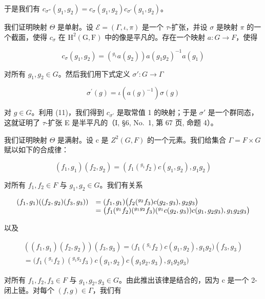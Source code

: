 于是我们有 \(c_{\sigma''}(g_1, g_2) = c_\sigma(g_1, g_2)c_{\sigma'}(g_1, g_2)\)。

我们证明映射 \(\Theta\) 是单射。设 \(\mathcal{E} = (\Gamma, \iota, \pi)\) 是一个 \(\tau\)-扩张，并设 \(\sigma\) 是映射 \(\pi\) 的一个截面，使得 \(c_{\sigma}\) 在 \(\mathrm{H}^{2}(\mathrm{G}, \mathrm{F})\) 中的像是平凡的。存在一个映射 \(a : G \to F\)，使得

\[
c _ {\sigma} (g _ {1}, g _ {2}) = (^ {g _ {1}} a (g _ {2})) a (g _ {1} g _ {2}) ^ {- 1} a (g _ {1})
\]

对所有 \(g_{1}, g_{2} \in G\)。然后我们用下式定义 \(\sigma' : G \to \Gamma\)

\[
\sigma^ {\prime} (g) = \iota (a (g) ^ {- 1}) \sigma (g)
\]

对 \(g \in G\)。利用 (11)，我们得到 \(c_{\sigma'}\) 是取常值 1 的映射；于是 \(\sigma'\) 是一个群同态，这就证明了 \(\tau\)-扩张 E 是半平凡的（I, §6, No.~1, 第 67 页, 命题 4）。

我们证明映射 \(\Theta\) 是满射。设 c 是 \(Z^{2}(G,F)\) 的一个元素。我们给集合 \(\Gamma = F \times G\) 赋以如下的合成律：

\[
(f _ {1}, g _ {1}) (f _ {2}, g _ {2}) = \left(f _ {1} (^ {g _ {1}} f _ {2}) c (g _ {1}, g _ {2}), g _ {1} g _ {2}\right)\tag{12}
\]

对所有 \(f_{1}, f_{2} \in F\) 与 \(g_{1}, g_{2} \in G\)。我们有关系

\[
\begin{array}{r l} (f _ {1}, g _ {1}) ((f _ {2}, g _ {2}) (f _ {3}, g _ {3})) & = (f _ {1}, g _ {1}) \big (f _ {2} (^ {g _ {2}} f _ {3}) c (g _ {2}, g _ {3}), g _ {2} g _ {3} \big) \\ & = \big (f _ {1} (^ {g _ {1}} f _ {2}) (^ {g _ {1} g _ {2}} f _ {3}) (^ {g _ {1}} c (g _ {2}, g _ {3})) c (g _ {1}, g _ {2} g _ {3}), g _ {1} g _ {2} g _ {3} \big) \end{array}
\]

以及

\[
\begin{array}{c} ((f _ {1}, g _ {1}) (f _ {2}, g _ {2}))   (f _ {3}, g _ {3}) = \big (f _ {1} (^ {g _ {1}} f _ {2}) c (g _ {1}, g _ {2}), g _ {1} g _ {2} \big) (f _ {3}, g _ {3}) \\ = \big (f _ {1} (^ {g _ {1}} f _ {2}) (^ {g _ {1} g _ {2}} f _ {3}) c (g _ {1}, g _ {2}) c (g _ {1} g _ {2}, g _ {3}), g _ {1} g _ {2} g _ {3} \big) \end{array}
\]

对所有 \(f_{1}, f_{2}, f_{3} \in F\) 与 \(g_{1}, g_{2}, g_{3} \in G\)。由此推出该律是结合的，因为 c 是一个 2-闭上链。对每个 \((f, g) \in \Gamma\)，我们有

